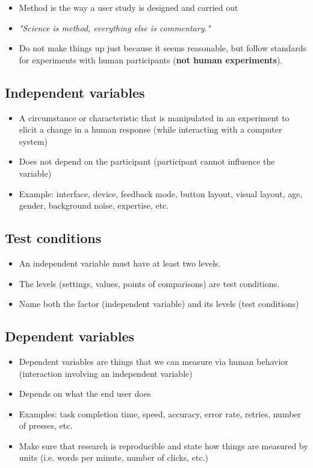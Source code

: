\documentclass[12pt]{book}
\begin{document}
\begin{itemize}
  \item Method is the way a user study is designed and carried out
  \item \textit{"Science is method, everything else is commentary."}
  \item Do not make things up just because it seems reasonable, but follow standards for experiments with human participants (\textbf{not human experiments}).

\end{itemize}

\subsection*{Independent variables}

\begin{itemize}
  \item A circumstance or characteristic that is manipulated in an experiment to elicit a change in a human response (while interacting with a computer system)
  \item Does not depend on the participant (participant cannot influence the variable)
  \item Example: interface, device, feedback mode, button layout, visual layout, age, gender, background noise, expertise, etc.
\end{itemize}

\subsection*{Test conditions}

\begin{itemize}
  \item An independent variable must have at least two levels.
  \item The levels (settings, values, points of comparisons) are test conditions.
  \item Name both the factor (independent variable) and its levels (test conditions)
\end{itemize}

\subsection*{Dependent variables}

\begin{itemize}
  \item Dependent variables are things that we can measure via human behavior (interaction involving an independent variable)
  \item Depends on what the end user does
  \item Examples: task completion time, speed, accuracy, error rate, retries, number of presses, etc.
  \item Make sure that research is reproducible and state how things are measured by units (i.e. words per minute, number of clicks, etc.)
\end{itemize}
\end{document}
